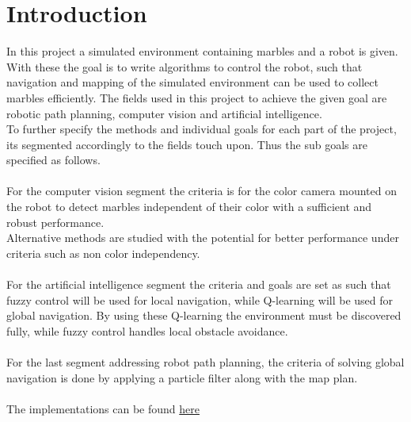 \documentclass[../main]{subfiles}
\begin{document}
\section{Introduction}
\label{sec:indledning}


In this project a simulated environment containing marbles and a robot is given.
With these the goal is to write algorithms to control the robot,
such that navigation and mapping of the simulated environment can be used to collect marbles efficiently.
The fields used in this project to achieve the given goal are robotic path planning,
computer vision and artificial intelligence.\\
To further specify the methods and individual goals for each part of the project, its segmented accordingly to the fields touch upon.
Thus the sub goals are specified as follows.\\ \\

For the computer vision segment the criteria is for the color camera mounted on the robot to detect marbles
independent of their color with a sufficient and robust performance.\\
Alternative methods are studied with the potential for better performance under criteria such as non color independency.\\ \\

For the artificial intelligence segment the criteria and goals are set as such that fuzzy control will be used for local navigation,
while Q-learning will be used for global navigation. By using these Q-learning the environment must be discovered fully,
while fuzzy control handles local obstacle avoidance.\\ \\

For the last segment addressing robot path planning, the criteria of solving global navigation is done by applying a particle
filter along with the map plan. \\ \\

The implementations can be found \href{https://github.com/askebm/rb-rca5-cowsay}{ here}
\end{document}
